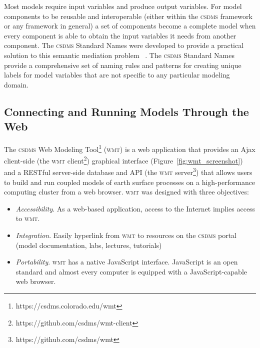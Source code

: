 \documentclass[11pt, oneside]{amsart}
\DeclareRobustCommand{\csdms}{\textsc{csdms}}
\DeclareRobustCommand{\wmt}{\textsc{wmt}}
\begin{document}
Most models require input variables and produce output variables. For model
components to be reusable and interoperable (either within the \csdms{}
framework or any framework in general)
a set of components become a complete model when every component is able to
obtain the input variables it needs from another component. The \csdms{}
Standard Names were developed to provide a practical solution to this
semantic mediation problem ~\cite{peckham2012component, syvitski2014plug}.
The \csdms{} Standard Names provide a comprehensive set of naming rules and
patterns for creating unique labels for model variables that are not specific
to any particular modeling domain.

\subsection{Connecting and Running Models Through the Web}
\label{sec:wmt}

The \csdms{} Web Modeling Tool\footnote{https://csdms.colorado.edu/wmt}
(\wmt{}) is a web
application that provides an Ajax client-side (the \wmt{}
client\footnote{https://github.com/csdms/wmt-client}) graphical interface
(Figure~\ref{fig:wmt_screenshot}) and a RESTful
server-side database and API (the \wmt{} server\footnote{https://github.com/csdms/wmt})
that allows users to build and run coupled models of earth surface processes on
a high-performance computing cluster from a web browser. \wmt{} was designed
with three objectives:
\begin{itemize}

\item \emph{Accessibility}. As a web-based application, access
      to the Internet implies access to \wmt{}.

\item \emph{Integration}. Easily hyperlink from \wmt{} to resources on the 
      \csdms{} portal (model documentation, labs, lectures,
      tutorials)

\item \emph{Portability}. \wmt{} has a native JavaScript interface. JavaScript
      is an open standard and almost every computer is equipped with a
      JavaScript-capable web browser.

\end{itemize}
\end{document}
